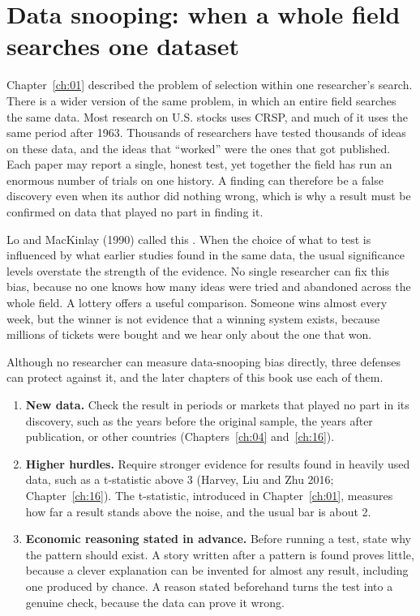 \section{Data snooping: when a whole field searches one dataset}
\label{sec:02-snooping}

Chapter~\ref{ch:01} described the problem of selection within one researcher's search. There is a wider version of the same problem, in which an entire field searches the same data. Most research on U.S. stocks uses CRSP, and much of it uses the same period after 1963. Thousands of researchers have tested thousands of ideas on these data, and the ideas that ``worked'' were the ones that got published. Each paper may report a single, honest test, yet together the field has run an enormous number of trials on one history. A finding can therefore be a false discovery even when its author did nothing wrong, which is why a result must be confirmed on data that played no part in finding it.

Lo and MacKinlay (1990) called this . When the choice of what to test is influenced by what earlier studies found in the same data, the usual significance levels overstate the strength of the evidence. No single researcher can fix this bias, because no one knows how many ideas were tried and abandoned across the whole field. A lottery offers a useful comparison. Someone wins almost every week, but the winner is not evidence that a winning system exists, because millions of tickets were bought and we hear only about the one that won.

Although no researcher can measure data-snooping bias directly, three defenses can protect against it, and the later chapters of this book use each of them.

\begin{enumerate}
  \item \textbf{New data.} Check the result in periods or markets that played no part in its discovery, such as the years before the original sample, the years after publication, or other countries (Chapters~\ref{ch:04} and~\ref{ch:16}).
  \item \textbf{Higher hurdles.} Require stronger evidence for results found in heavily used data, such as a t-statistic above 3 (Harvey, Liu and Zhu 2016; Chapter~\ref{ch:16}). The t-statistic, introduced in Chapter~\ref{ch:01}, measures how far a result stands above the noise, and the usual bar is about 2.
    \item \textbf{Economic reasoning stated in advance.} Before running a test, state why the pattern should exist. A story written after a pattern is found proves little, because a clever explanation can be invented for almost any result, including one produced by chance. A reason stated beforehand turns the test into a genuine check, because the data can prove it wrong.
\end{enumerate}

